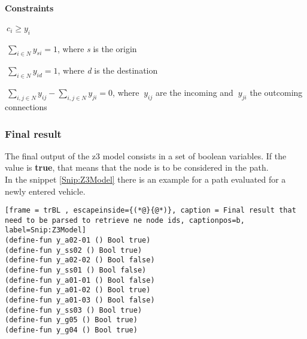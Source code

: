 \paragraph{Constraints}
\begin{description}
	\item $\ c_{i} \geq y_{i} $
	\item $\ \sum_{i \in N} y_{si} = 1$, where \textit{s} is the origin 
	\item $\ \sum_{i \in N} y_{id} = 1$, where \textit{d} is the destination
	\item $\ \sum_{i,j \in N} y_{ij} - \sum_{i,j \in N} y_{ji} = 0$, where $\ y_{ij}$ are the incoming and $\ y_{ji}$ the outcoming connections 	
\end{description}

\subsubsection{Final result}
The final output of the z3 model consists in a set of boolean variables. If the value is \textbf{true}, that means that the node is to be considered in the path.\\
In the snippet \ref{Snip:Z3Model} there is an example for a path evaluated for a newly entered vehicle.
\begin{lstlisting}[frame = trBL , escapeinside={(*@}{@*)}, caption = Final result that need to be parsed to retrieve ne node ids, captionpos=b, label=Snip:Z3Model]
(define-fun y_a02-01 () Bool true)
(define-fun y_ss02 () Bool true)
(define-fun y_a02-02 () Bool false)
(define-fun y_ss01 () Bool false)
(define-fun y_a01-01 () Bool false)
(define-fun y_a01-02 () Bool true)
(define-fun y_a01-03 () Bool false)
(define-fun y_ss03 () Bool true)
(define-fun y_g05 () Bool true)
(define-fun y_g04 () Bool true)
\end{lstlisting}

